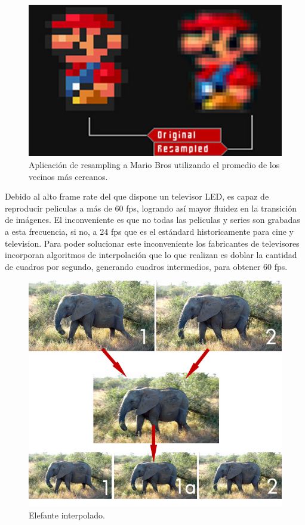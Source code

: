 \begin{figure}[h]
  \centering
  \begin{minipage}[b]{.5\textwidth}
    \includegraphics[width=\textwidth]{complementos/mario_resampled.jpg}
    \caption{Aplicación de resampling a Mario Bros utilizando el promedio de los vecinos más cercanos.}
  \end{minipage}
\end{figure}

Debido al alto frame rate del que dispone un televisor LED, es capaz de reproducir peliculas a más de 60 fps, logrando así mayor fluidez en la transición de imágenes.
El inconveniente es que no todas las peliculas y series son grabadas a esta frecuencia, si no, a 24 fps que es el estándard historicamente para cine y television. Para poder solucionar este inconveniente los fabricantes de televisores incorporan algoritmos de interpolación que lo que realizan es doblar la cantidad de cuadros por segundo, generando cuadros intermedios, para obtener 60 fps.

\begin{figure}[h]
  \centering
  \begin{minipage}[b]{.5\textwidth}
    \includegraphics[width=\textwidth]{complementos/elephant.jpg}
    \caption{Elefante interpolado.}
  \end{minipage}
\end{figure}

